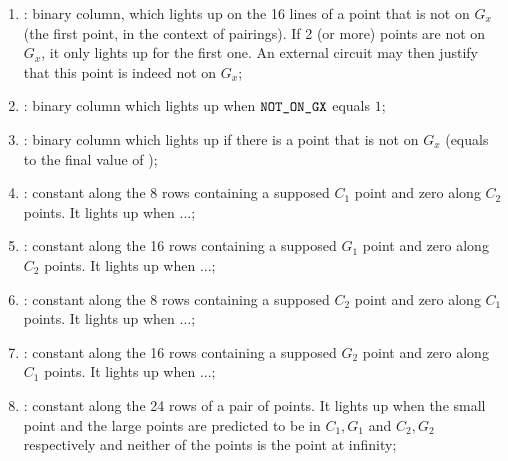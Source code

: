 \begin{enumerate}[resume]
      \item \notOnGX{ }\blsPrediction{}: binary column, which lights up on the 16 lines of a point that is not on $G_x$ (the first point, in the context of pairings). If 2 (or more) points are not on $G_x$, it only lights up for the first one. An external circuit may then justify that this point is indeed not on $G_x$;
      \item \notOnGXAcc: binary column which lights up when $\texttt{NOT\_ON\_GX}$ equals $1$;
      \item \notOnGXAccMax: binary column which lights up if there is a point that is not on $G_x$ (equals to the final value of \notOnGXAcc);
      
      \item \both{\cOneMembershipTestRequired}:
            constant along the 8 rows containing a supposed $C_1$ point and zero along $C_2$ points. It lights up when ...;
      \item \both{\gOneMembershipTestRequired}:
            constant along the 16 rows containing a supposed $G_1$ point and zero along $C_2$ points. It lights up when ...;
      \item \both{\cTwoMembershipTestRequired}:
            constant along the 8 rows containing a supposed $C_2$ point and zero along $C_1$ points. It lights up when ...;
      \item \both{\gTwoMembershipTestRequired}:
            constant along the 16 rows containing a supposed $G_2$ point and zero along $C_1$ points. It lights up when ...;
      \item \both{\acceptablePairOfPoints}: constant along the 24 rows of a pair of points. It lights up when the small point and the large points are predicted to be in $C_1,G_1$ and $C_2,G_2$ respectively and neither of the points is the point at infinity;
\end{enumerate}
     
